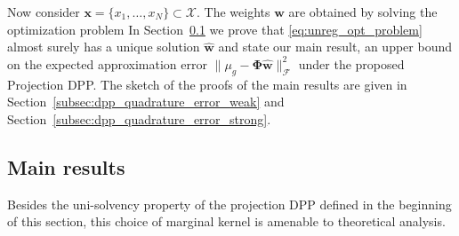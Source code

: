 \documentclass[twoside,11pt]{book}
\DeclareMathOperator{\Tran}{\intercal}
\begin{document}
Now consider $\bm{x} = \{x_{1}, \dots, x_{N} \} \subset \mathcal{X}$. The weights $\bm{w}$ are obtained by solving the optimization problem
 In Section~\ref{subsec:unreg_opt_problem} we prove that \eqref{eq:unreg_opt_problem} almost surely has a unique solution $\hat{\bm{w}}$ and state our main result, an upper bound on the expected approximation error $\|\mu_{g} - \bm{\Phi}\hat{\bm{w}}\|^{2}_{\mathcal{F}}$ under the proposed Projection DPP. The sketch of the proofs of the main results are given in Section~\ref{subsec:dpp_quadrature_error_weak} and  Section~\ref{subsec:dpp_quadrature_error_strong}.

\subsection{Main results}
\label{subsec:unreg_opt_problem}
Besides the uni-solvency property of the projection DPP defined in the beginning of this section, this choice of marginal kernel is amenable to theoretical analysis.




\end{document}
